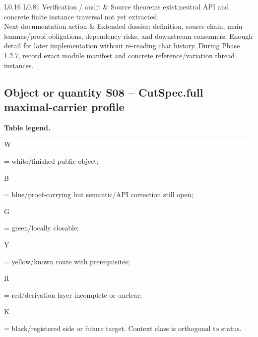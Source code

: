 \begin{longtable}{L{0.16\linewidth} L{0.81\linewidth}}
\hline\addlinespace[0.20em]
Verification /\allowbreak{} audit & Source theorems exist;\newline neutral API and concrete finite instance traversal not yet extracted.\\
\hline\addlinespace[0.20em]
Next documentation action & Extended dossier: definition, source chain, main lemmas/\allowbreak{}proof obligations, dependency risks, and downstream consumers. Enough detail for later implementation without re-reading chat history. During Phase 1.2.7, record exact module manifest and concrete reference/\allowbreak{}variation thread instances.\\
\hline\addlinespace[0.20em]
\end{longtable}
\subsection*{Object or quantity S08 -- CutSpec.full maximal-carrier profile}
\hypertarget{objproof:S08}{}
\par\smallskip\noindent\begin{minipage}{0.99\linewidth}\footnotesize\raggedright\textbf{Table legend.} \colorbox{white}{\strut W} = white/finished public object; \colorbox{cyan!20}{\strut B} = blue/proof-carrying but semantic/API correction still open; \colorbox{green!18}{\strut G} = green/locally closable; \colorbox{yellow!25}{\strut Y} = yellow/known route with prerequisites; \colorbox{red!20}{\strut R} = red/derivation layer incomplete or unclear; \colorbox{black!18}{\strut K} = black/registered side or future target. Context class is orthogonal to status.\end{minipage}\par\vspace{0.25em}
